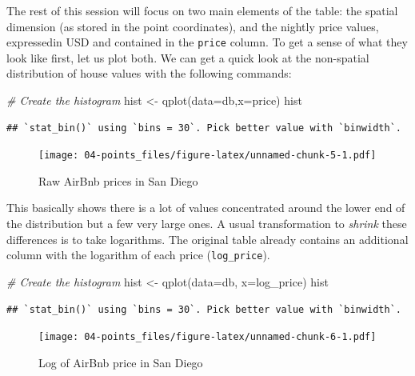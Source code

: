 \documentclass[
]{book}
\newenvironment{Shaded}{\begin{snugshade}}{\end{snugshade}}
\newcommand{\AttributeTok}[1]{\textcolor[rgb]{0.77,0.63,0.00}{#1}}
\newcommand{\CommentTok}[1]{\textcolor[rgb]{0.56,0.35,0.01}{\textit{#1}}}
\newcommand{\FunctionTok}[1]{\textcolor[rgb]{0.00,0.00,0.00}{#1}}
\newcommand{\NormalTok}[1]{#1}
\newcommand{\OtherTok}[1]{\textcolor[rgb]{0.56,0.35,0.01}{#1}}
\begin{document}
The rest of this session will focus on two main elements of the table: the spatial dimension (as stored in the point coordinates), and the nightly price values, expressedin USD and contained in the \texttt{price} column. To get a sense of what they look like first, let us plot both. We can get a quick look at the non-spatial distribution of house values with the following commands:

\begin{Shaded}
\begin{Highlighting}[]
\CommentTok{\# Create the histogram}
\NormalTok{hist }\OtherTok{\textless{}{-}} \FunctionTok{qplot}\NormalTok{(}\AttributeTok{data=}\NormalTok{db,}\AttributeTok{x=}\NormalTok{price)}
\NormalTok{hist}
\end{Highlighting}
\end{Shaded}

\begin{verbatim}
## `stat_bin()` using `bins = 30`. Pick better value with `binwidth`.
\end{verbatim}

\begin{figure}
\centering
\texttt{[image: 04-points\_files/figure-latex/unnamed-chunk-5-1.pdf]}
\caption{\label{fig:unnamed-chunk-5}Raw AirBnb prices in San Diego}
\end{figure}

This basically shows there is a lot of values concentrated around the lower end of the distribution but a few very large ones. A usual transformation to \emph{shrink} these differences is to take logarithms. The original table already contains an additional column with the logarithm of each price (\texttt{log\_price}).

\begin{Shaded}
\begin{Highlighting}[]
\CommentTok{\# Create the histogram}
\NormalTok{hist }\OtherTok{\textless{}{-}} \FunctionTok{qplot}\NormalTok{(}\AttributeTok{data=}\NormalTok{db, }\AttributeTok{x=}\NormalTok{log\_price)}
\NormalTok{hist}
\end{Highlighting}
\end{Shaded}

\begin{verbatim}
## `stat_bin()` using `bins = 30`. Pick better value with `binwidth`.
\end{verbatim}

\begin{figure}
\centering
\texttt{[image: 04-points\_files/figure-latex/unnamed-chunk-6-1.pdf]}
\caption{\label{fig:unnamed-chunk-6}Log of AirBnb price in San Diego}
\end{figure}
\end{document}
